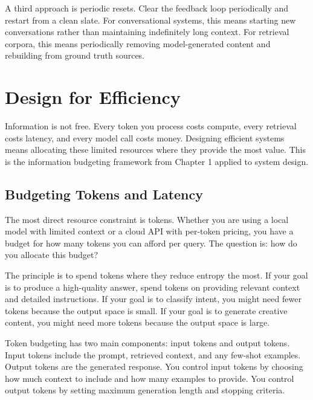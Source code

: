 A third approach is periodic resets. Clear the feedback loop periodically and restart from a clean slate. For conversational systems, this means starting new conversations rather than maintaining indefinitely long context. For retrieval corpora, this means periodically removing model-generated content and rebuilding from ground truth sources.

\vspace{2em}

\section{Design for Efficiency}

Information is not free. Every token you process costs compute, every retrieval costs latency, and every model call costs money. Designing efficient systems means allocating these limited resources where they provide the most value. This is the information budgeting framework from Chapter 1 applied to system design.

\vspace{1em}

\subsection{Budgeting Tokens and Latency}

The most direct resource constraint is tokens. Whether you are using a local model with limited context or a cloud API with per-token pricing, you have a budget for how many tokens you can afford per query. The question is: how do you allocate this budget?

The principle is to spend tokens where they reduce entropy the most. If your goal is to produce a high-quality answer, spend tokens on providing relevant context and detailed instructions. If your goal is to classify intent, you might need fewer tokens because the output space is small. If your goal is to generate creative content, you might need more tokens because the output space is large.

Token budgeting has two main components: input tokens and output tokens. Input tokens include the prompt, retrieved context, and any few-shot examples. Output tokens are the generated response. You control input tokens by choosing how much context to include and how many examples to provide. You control output tokens by setting maximum generation length and stopping criteria.

